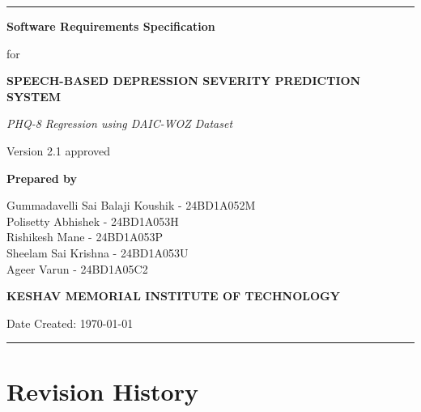\documentclass[12pt]{article}
\begin{document}

	\begin{titlepage}
		\centering

		\vspace*{1cm}
		\rule{\textwidth}{1pt}

		\vspace{2cm}

		{\Huge \textbf{Software Requirements Specification}}

		\vspace{1cm}

		{\Large for}

		\vspace{0.5cm}

		{\LARGE \textbf{SPEECH-BASED DEPRESSION SEVERITY PREDICTION SYSTEM}}

		\vspace{0.5cm}

		{\large \textit{PHQ-8 Regression using DAIC-WOZ Dataset}}

		\vspace{2cm}

		Version 2.1 approved

		\vspace{2cm}

		\textbf{Prepared by}

		\vspace{0.5cm}

		Gummadavelli Sai Balaji Koushik - 24BD1A052M \\
		Polisetty Abhishek - 24BD1A053H \\
		Rishikesh Mane - 24BD1A053P \\
		Sheelam Sai Krishna - 24BD1A053U \\
		Ageer Varun - 24BD1A05C2 \\

		\vspace{2cm}

		\textbf{KESHAV MEMORIAL INSTITUTE OF TECHNOLOGY}

		\vfill

		Date Created: \today

		\vspace{1cm}

		\rule{\textwidth}{1pt}

	\end{titlepage}


	\section*{Revision History}
\end{document}
